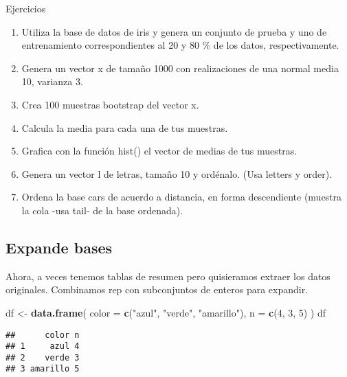 \documentclass[]{article}
\newenvironment{Shaded}{\begin{snugshade}}{\end{snugshade}}
\newcommand{\KeywordTok}[1]{\textcolor[rgb]{0.13,0.29,0.53}{\textbf{#1}}}
\newcommand{\DataTypeTok}[1]{\textcolor[rgb]{0.13,0.29,0.53}{#1}}
\newcommand{\DecValTok}[1]{\textcolor[rgb]{0.00,0.00,0.81}{#1}}
\newcommand{\StringTok}[1]{\textcolor[rgb]{0.31,0.60,0.02}{#1}}
\newcommand{\OperatorTok}[1]{\textcolor[rgb]{0.81,0.36,0.00}{\textbf{#1}}}
\newcommand{\NormalTok}[1]{#1}
\begin{document}
\begin{bclogo}[
  couleur=llred,
  arrondi=0,
  logo=\bcstop,
  barre=none,
  noborder=true]{Ejercicios}
\begin{enumerate}
\item Utiliza la base de datos de iris y genera un conjunto de prueba y uno de entrenamiento correspondientes al 20 y 80 \% de los datos, respectivamente.
\item Genera un vector x de tamaño 1000 con realizaciones de una normal media 10, varianza 3. 
\item Crea 100 muestras bootstrap del vector x.
\item Calcula la media para cada una de tus muestras.
\item Grafica con la función hist() el vector de medias de tus muestras.
\item Genera un vector l de letras, tamaño 10 y ordénalo. (Usa letters y order).
\item Ordena la base cars de acuerdo a distancia, en forma descendiente (muestra la cola -usa tail- de la base ordenada).
\end{enumerate}
\end{bclogo}

\subsection{Expande bases}\label{expande-bases}

Ahora, a veces tenemos tablas de resumen pero quisieramos extraer los
datos originales. Combinamos rep con subconjuntos de enteros para
expandir.

\begin{Shaded}
\begin{Highlighting}[]
\NormalTok{df <-}\StringTok{ }\KeywordTok{data.frame}\NormalTok{(}
  \DataTypeTok{color =} \KeywordTok{c}\NormalTok{(}\StringTok{"azul"}\NormalTok{, }\StringTok{"verde"}\NormalTok{, }\StringTok{"amarillo"}\NormalTok{),}
  \DataTypeTok{n =} \KeywordTok{c}\NormalTok{(}\DecValTok{4}\NormalTok{, }\DecValTok{3}\NormalTok{, }\DecValTok{5}\NormalTok{)}
\NormalTok{)}
\NormalTok{df}
\end{Highlighting}
\end{Shaded}

\begin{verbatim}
##      color n
## 1     azul 4
## 2    verde 3
## 3 amarillo 5
\end{verbatim}

\begin{Shaded}
\end{Shaded}
\end{document}
